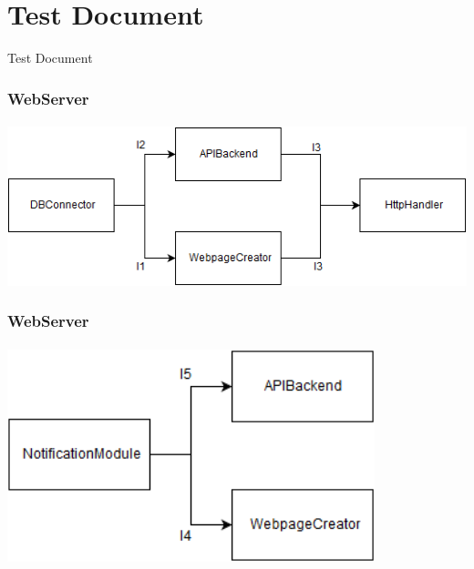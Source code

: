 \documentclass[10pt,xcolor={usenames,dvipsnames}]{beamer}
\begin{document}
\section[Section]{Test Document}
\begin{frame}
	\begin{center}
		Test Document	
	\end{center}
\end{frame}
\begin{frame}
	\frametitle{WebServer}
	\framesubtitle{}
		\includegraphics[width=\textwidth,height=\textheight,keepaspectratio]{WebServer1}\\
\end{frame}
 \begin{frame}
	\frametitle{WebServer}
	\framesubtitle{}
	\begin{center}
		\includegraphics[width=0.8\textwidth,height=0.8\textheight,keepaspectratio]{WebServer2}
	\end{center}
\end{frame}
\end{document}
